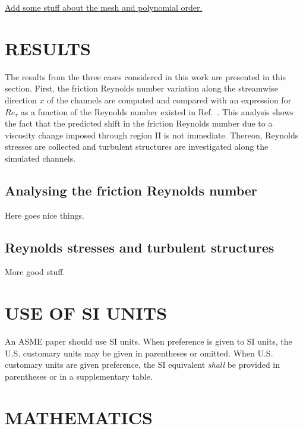 \documentclass[twocolumn,10pt]{asme2e}
\begin{document}
\underline{Add some stuff about the mesh and polynomial order.}




\section*{RESULTS}

The results from the three cases considered in this work are presented in this section. First, the friction Reynolds number variation along the streamwise direction \(x\) of the channels are computed and compared with an expression for \(Re_{\tau}\) as a function of the Reynolds number existed in Ref.~\cite{pope}. This analysis shows the fact that the predicted shift in the friction Reynolds number due to a viscosity change imposed through region II is not immediate. Thereon, Reynolds stresses are collected and turbulent structures are investigated along the simulated channels.


\subsection*{Analysing the friction Reynolds number}

Here goes nice things.

\subsection*{Reynolds stresses and turbulent structures}

More good stuff.



\section*{USE OF SI UNITS}

An ASME paper should use SI units.  When preference is given to SI units, the U.S. customary units may be given in parentheses or omitted. When U.S. customary units are given preference, the SI equivalent {\em shall} be provided in parentheses or in a supplementary table. 

\section*{MATHEMATICS}
\end{document}
